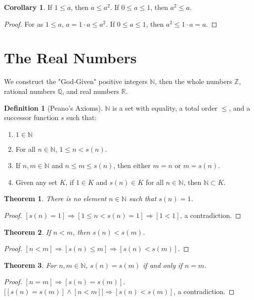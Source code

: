 \documentclass[oneside]{book}
\newtheorem{theorem}{Theorem}[section]
\theoremstyle{definition}
\newtheorem{definition}{Definition}[section]
\newtheorem{corollary}{Corollary}[section]
\begin{document}
\begin{corollary}
If $1\leq a$, then $a \leq a^2$. If $0\leq a \leq 1$, then $a^2 \leq a$.
\end{corollary}
\begin{proof}
For as $1\leq a$, $a=1\cdot a \leq a^2$. If $0\leq a \leq 1$, then $a^2 \leq 1\cdot a = a$.
\end{proof}

\section{The Real Numbers}

We construct the "God-Given" positive integers $\mathbb{N}$, then the whole numbers $\mathbb{Z}$, rational numbers $\mathbb{Q}$, and real numbers $\mathbb{R}$.

\begin{definition}[Peano's Axioms]
$\mathbb{N}$ is a set with equality, a total order $\leq$, and a successor function $s$ such that:
\begin{enumerate}
\item $1\in \mathbb{N}$
\item For all $n\in \mathbb{N}$, $1\leq n < s(n)$.
\item If $n,m\in \mathbb{N}$ and $n\leq m \leq s(n)$, then either $m=n$ or $m=s(n)$.
\item Given any set $K$, if $1\in K$ and $s(n)\in K$ for all $n\in \mathbb{N}$, then $\mathbb{N}\subset K$.
\end{enumerate}
\end{definition}

\begin{theorem}
There is no element $n\in \mathbb{N}$ such that $s(n) =1$.
\end{theorem}
\begin{proof}
$[s(n) = 1]\Rightarrow [1\leq n < s(n)=1]\Rightarrow[1<1]$, a contradiction.
\end{proof}

\begin{theorem}
If $n<m$, then $s(n)< s(m)$.
\end{theorem}
\begin{proof}
$[n<m]\Rightarrow [s(n)\leq m] \Rightarrow [s(n) < s(m)]$.
\end{proof}

\begin{theorem}
For $n,m\in \mathbb{N}$, $s(n)=s(m)$ if and only if $n=m$.
\end{theorem}
\begin{proof}
$[n=m]\Rightarrow [s(n)=s(m)]$. $\big[[s(n)=s(m)]\land [n<m]\big] \Rightarrow [s(n)<s(m)]$, a contradiction.
\end{proof}
\end{document}
